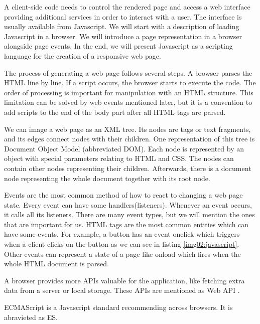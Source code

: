 A client-side code needs to control the rendered page and access a web interface providing additional services in order to interact with a user.
The interface is usually available from Javascript.
We will start with a description of loading Javascript in a browser.
We will introduce a page representation in a browser alongside page events.
In the end, we will present Javascript as a scripting language for the creation of a responsive web page.
\par
{}
The process of generating a web page follows several steps.
A browser parses the HTML line by line. If a script occurs, the browser starts to execute the code.
The order of processing is important for manipulation with an HTML structure.
This limitation can be solved by web events mentioned later, but
it is a convention to add scripts to the end of the body part after all HTML tags are parsed.
\par
We can image a web page as an XML tree.
Its nodes are tags or text fragments, and its edges connect nodes with their children.
One representation of this tree is Document Object Model (abbreviated DOM).
Each node is represented by an object with special parameters relating to HTML and CSS. 
The nodes can contain other nodes representing their children.
Afterwards, there is a document node representing the whole document together with its root node.
\par
Events are the most common method of how to react to changing a web page state.
Every event can have some handlers(listeners).
Whenever an event occurs, it calls all its listeners.
There are many event types, but we will mention the ones that are important for us.
HTML tags are the most common entities which can have some events.
For example, a button has an event onclick which triggers when a client clicks on the button as we can see in listing \ref{img02:javascript}. 
Other events can represent a state of a page like onload which fires when the whole HTML document is parsed.
\par
A browser provides more APIs valuable for the application, like fetching extra data from a server or local storage.
These APIs are mentioned as Web API .
\par
ECMAScript is a Javascript standard recommending across browsers.
It is abravieted as ES.
